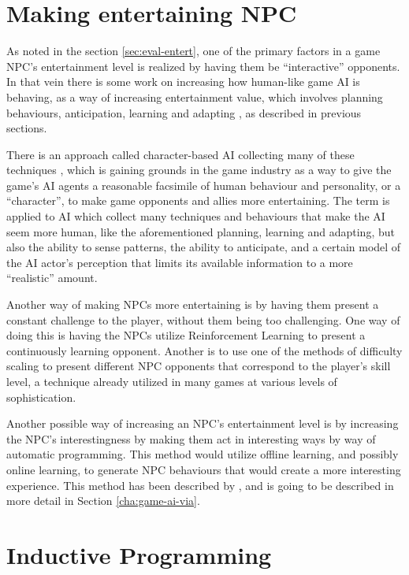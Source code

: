 \section{Making entertaining NPC}
\label{sec:making-entert-npc}

As noted in the section \ref{sec:eval-entert}, one of the primary factors in a game NPC's
entertainment level is realized by having them be ``interactive'' opponents.
In that vein there is some work on increasing how human-like game AI is
behaving, as a way of increasing entertainment value, which involves planning
behaviours, anticipation, learning and adapting
\citep{orkin2004symbolic,orkin2003applying,
  yannakakis2009real,spronck2005adaptive}, as described in previous sections.

There is an approach called character-based AI collecting many of these
techniques \citep{isla2002new}, which is gaining grounds in the game industry as
a way to give the game's AI agents a reasonable facsimile of human behaviour and
personality, or a ``character'', to make game opponents and allies more
entertaining. The term is applied to AI which collect many techniques and
behaviours that make the AI seem more human, like the aforementioned planning,
learning and adapting, but also the ability to sense patterns, the ability to
anticipate, and a certain model of the AI actor's perception that limits its
available information to a more ``realistic'' amount.

Another way of making NPCs more entertaining is by having them present a
constant challenge to the player, without them being too challenging. One way of
doing this is having the NPCs utilize Reinforcement Learning
\citep{merrick2006motivated,sutton1998reinforcement} to present a continuously
learning opponent. Another is to use one of the methods of difficulty scaling to
present different NPC opponents that correspond to the player's skill level, a
technique already utilized in many games at various levels of sophistication.

Another possible way of increasing an NPC's entertainment level is by increasing
the NPC's interestingness by making them act in interesting ways by way of
automatic programming. This method would utilize offline learning, and possibly
online learning, to generate NPC behaviours that would create a more interesting
experience. This method has been described by \citet{yannakakis2005ai}, and is
going to be described in more detail in Section \ref{cha:game-ai-via}.

\section{Inductive Programming}
\label{cha:induct-progr}

